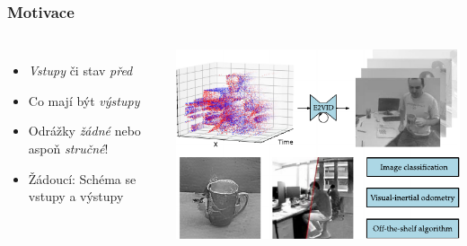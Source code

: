 \begin{frame}
  \frametitle{Motivace}
  \begin{columns}
    \begin{itemize}
        \item \emph{Vstupy} či stav \emph{před}
        \item Co mají být \emph{výstupy}
        \item Odrážky \emph{žádné} nebo aspoň \emph{stručné}!
        \item Žádoucí: Schéma se vstupy a výstupy
    \end{itemize}
     
    \includegraphics[width=\textwidth]{img/template-Teaser.pdf}
  \end{columns}
\end{frame}






